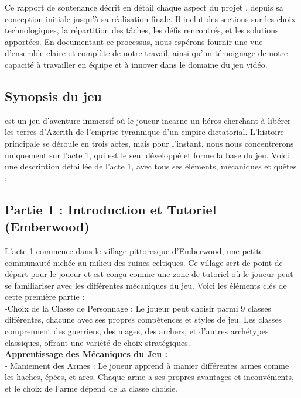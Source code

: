 Ce rapport de soutenance décrit en détail chaque aspect du projet 
\gameName, depuis sa conception initiale jusqu'à sa réalisation finale. 
Il inclut des sections sur les choix technologiques, la répartition des tâches, les défis rencontrés, et les solutions apportées. En documentant ce processus,
 nous espérons fournir une vue d'ensemble claire et complète de notre travail, ainsi qu'un témoignage de notre capacité à travailler en équipe et à innover dans le domaine du 
 jeu vidéo.






\subsection{Synopsis du jeu}

\gameName est un jeu d'aventure immersif où le joueur incarne un héros cherchant à libérer les terres d'Azerith de l'emprise tyrannique d'un empire dictatorial.
L'histoire principale se déroule en trois actes, mais pour l'instant, nous nous concentrerons uniquement sur l'acte 1, qui est le seul développé et forme la base du jeu.
Voici une description détaillée de l'acte 1, avec tous ses éléments, mécaniques et quêtes :

\subsection*{Partie 1 : Introduction et Tutoriel (Emberwood)}

L'acte 1 commence dans le village pittoresque d'Emberwood, une petite communauté nichée au milieu des ruines celtiques.
Ce village sert de point de départ pour le joueur et est conçu comme une zone de tutoriel où le joueur peut se familiariser avec les différentes mécaniques du jeu.
Voici les éléments clés de cette première partie :
\\

-Choix de la Classe de Personnage : Le joueur peut choisir parmi 9 classes différentes, chacune avec ses propres compétences et styles de jeu. Les classes comprennent des guerriers, des mages, des archers, et d'autres archétypes classiques, offrant une variété de choix stratégiques.
\\

\textbf{Apprentissage des Mécaniques du Jeu : }
\\

- Maniement des Armes : Le joueur apprend à manier différentes armes comme les haches, épées, et arcs.
Chaque arme a ses propres avantages et inconvénients, et le choix de l'arme dépend de la classe choisie.
\\

